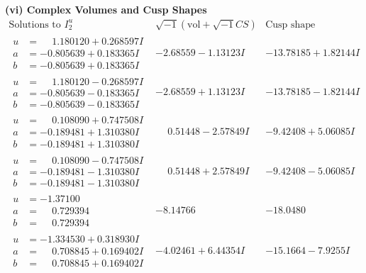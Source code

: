 \documentclass[1p]{elsarticle_modified}
\theoremstyle{definition}
\newcommand{\I}{\sqrt{-1}}
\begin{document}
\newpage\flushleft \textbf{(vi) Complex Volumes and Cusp Shapes}
$$\begin{array}{c|c|c}  
\text{Solutions to }I^u_{2}& \I (\text{vol} + \sqrt{-1}CS) & \text{Cusp shape}\\
 \hline 
\begin{aligned}
u &= \phantom{-}1.180120 + 0.268597 I \\
a &= -0.805639 + 0.183365 I \\
b &= -0.805639 + 0.183365 I\end{aligned}
 & -2.68559 - 1.13123 I & -13.78185 + 1.82144 I \\ \hline\begin{aligned}
u &= \phantom{-}1.180120 - 0.268597 I \\
a &= -0.805639 - 0.183365 I \\
b &= -0.805639 - 0.183365 I\end{aligned}
 & -2.68559 + 1.13123 I & -13.78185 - 1.82144 I \\ \hline\begin{aligned}
u &= \phantom{-}0.108090 + 0.747508 I \\
a &= -0.189481 + 1.310380 I \\
b &= -0.189481 + 1.310380 I\end{aligned}
 & \phantom{-}0.51448 - 2.57849 I & -9.42408 + 5.06085 I \\ \hline\begin{aligned}
u &= \phantom{-}0.108090 - 0.747508 I \\
a &= -0.189481 - 1.310380 I \\
b &= -0.189481 - 1.310380 I\end{aligned}
 & \phantom{-}0.51448 + 2.57849 I & -9.42408 - 5.06085 I \\ \hline\begin{aligned}
u &= -1.37100\phantom{ +0.000000I} \\
a &= \phantom{-}0.729394\phantom{ +0.000000I} \\
b &= \phantom{-}0.729394\phantom{ +0.000000I}\end{aligned}
 & -8.14766\phantom{ +0.000000I} & -18.0480\phantom{ +0.000000I} \\ \hline\begin{aligned}
u &= -1.334530 + 0.318930 I \\
a &= \phantom{-}0.708845 + 0.169402 I \\
b &= \phantom{-}0.708845 + 0.169402 I\end{aligned}
 & -4.02461 + 6.44354 I & -15.1664 - 7.9255 I \\ \hline\begin{aligned}

\end{aligned}
\end{array}$$
\end{document}
